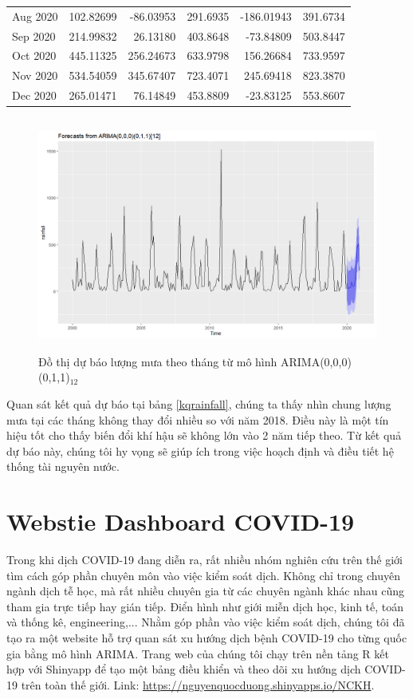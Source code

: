 \documentclass[12pt, a4paper,oneside]{book}
\theoremstyle{definition}
\begin{document}
\begin{table}[!h]
\begin{tabular}[t]{lrrrrr}
		Aug 2020 & 102.82699 & -86.03953 & 291.6935 & -186.01943 & 391.6734\\
		\addlinespace
		\rowcolor{gray!6}  Sep 2020 & 214.99832 & 26.13180 & 403.8648 & -73.84809 & 503.8447\\
		Oct 2020 & 445.11325 & 256.24673 & 633.9798 & 156.26684 & 733.9597\\
		\rowcolor{gray!6}  Nov 2020 & 534.54059 & 345.67407 & 723.4071 & 245.69418 & 823.3870\\
		Dec 2020 & 265.01471 & 76.14849 & 453.8809 & -23.83125 & 553.8607\\
		\bottomrule
	\end{tabular}
\end{table}
\begin{figure}[!htb]
	\centering
	\includegraphics[width=1\linewidth,height=7.7cm]{anh/V9}
	\vskip-4mm 
	\caption{Đồ thị dự báo lượng mưa theo tháng từ mô hình ARIMA(0,0,0)(0,1,1)$_{12}$}  
	\label{V9}
\end{figure}
Quan sát kết quả dự báo tại bảng \ref{kqrainfall}, chúng ta thấy nhìn chung lượng mưa tại các tháng không thay đổi nhiều so với năm 2018. Điều này là một tín hiệu tốt cho thấy biến đổi khí hậu sẽ không lớn vào 2 năm tiếp theo. Từ kết quả dự báo này, chúng tôi hy vọng sẽ giúp ích trong việc hoạch định và điều tiết hệ thống tài nguyên nước.
\section{Webstie Dashboard COVID-19}
Trong khi dịch COVID-19 đang diễn ra, rất nhiều nhóm nghiên cứu trên thế giới tìm cách góp phần chuyên môn vào việc kiểm soát dịch. Không chỉ trong chuyên ngành dịch tễ học, mà rất nhiều chuyên gia từ các chuyên ngành khác nhau cũng tham gia trực tiếp hay gián tiếp. Điển hình như giới miễn dịch học, kinh tế, toán và thống kê, engineering,... Nhằm góp phần vào việc kiểm soát dịch, chúng tôi đã tạo ra một website hỗ trợ quan sát xu hướng dịch bệnh COVID-19 cho từng quốc gia bằng mô hình ARIMA. Trang web của chúng tôi chạy trên nền tảng R kết hợp với Shinyapp để tạo một bảng điều khiển và theo dõi xu hướng dịch COVID-19 trên toàn thế giới.
Link: \url{https://nguyenquocduong.shinyapps.io/NCKH}.\\
\end{document}
